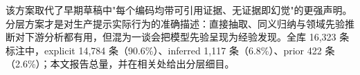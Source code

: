 \documentclass[11pt]{article}
\begin{document}
{\cjkfont 该\allowbreak 方\allowbreak 案\allowbreak 取\allowbreak 代\allowbreak 了\allowbreak 早\allowbreak 期\allowbreak 草\allowbreak 稿\allowbreak 中}"{\cjkfont 每\allowbreak 个\allowbreak 编\allowbreak 码\allowbreak 均\allowbreak 带\allowbreak 可\allowbreak 引\allowbreak 用\allowbreak 证\allowbreak 据\allowbreak 、\allowbreak 无\allowbreak 证\allowbreak 据\allowbreak 即\allowbreak 幻\allowbreak 觉}"{\cjkfont 的\allowbreak 更\allowbreak 强\allowbreak 声\allowbreak 明\allowbreak 。\allowbreak 分\allowbreak 层\allowbreak 方\allowbreak 案\allowbreak 才\allowbreak 是\allowbreak 对\allowbreak 生\allowbreak 产\allowbreak 提\allowbreak 示\allowbreak 实\allowbreak 际\allowbreak 行\allowbreak 为\allowbreak 的\allowbreak 准\allowbreak 确\allowbreak 描\allowbreak 述\allowbreak ：\allowbreak 直\allowbreak 接\allowbreak 抽\allowbreak 取\allowbreak 、\allowbreak 同\allowbreak 义\allowbreak 归\allowbreak 纳\allowbreak 与\allowbreak 领\allowbreak 域\allowbreak 先\allowbreak 验\allowbreak 推\allowbreak 断\allowbreak 对\allowbreak 下\allowbreak 游\allowbreak 分\allowbreak 析\allowbreak 都\allowbreak 有\allowbreak 用\allowbreak ，\allowbreak 但\allowbreak 混\allowbreak 为\allowbreak 一\allowbreak 谈\allowbreak 会\allowbreak 把\allowbreak 模\allowbreak 型\allowbreak 先\allowbreak 验\allowbreak 呈\allowbreak 现\allowbreak 为\allowbreak 经\allowbreak 验\allowbreak 发\allowbreak 现\allowbreak 。\allowbreak 全\allowbreak 库} 16,323 {\cjkfont 条\allowbreak 标\allowbreak 注\allowbreak 中\allowbreak ，}explicit 14,784 {\cjkfont 条\allowbreak （}90.6\%{\cjkfont ）\allowbreak 、}inferred 1,117 {\cjkfont 条\allowbreak （}6.8\%{\cjkfont ）\allowbreak 、}prior 422 {\cjkfont 条\allowbreak （}2.6\%{\cjkfont ）\allowbreak ；\allowbreak 本\allowbreak 文\allowbreak 报\allowbreak 告\allowbreak 总\allowbreak 量\allowbreak ，\allowbreak 并\allowbreak 在\allowbreak 相\allowbreak 关\allowbreak 处\allowbreak 给\allowbreak 出\allowbreak 分\allowbreak 层\allowbreak 细\allowbreak 目\allowbreak 。}
\end{document}
